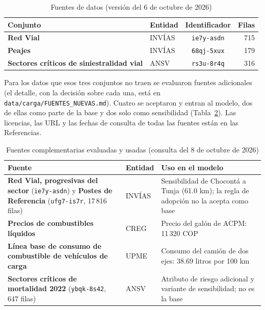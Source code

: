 \documentclass[12pt,a4paper]{article}
\begin{document}
\begin{table}[H]
\centering
\caption{Fuentes de datos (versión del 6 de octubre de 2026)}
\label{tab:fuentes}
\renewcommand{\arraystretch}{1.2}
\begin{tabular}{|l|l|c|r|}
\hline
\rowcolor{gray!20} \textbf{Conjunto} & \textbf{Entidad} & \textbf{Identificador} & \textbf{Filas} \\
\hline
\textbf{Red Vial} & INVÍAS & \texttt{ie7y-asdn} & 715 \\
\hline
\textbf{Peajes} & INVÍAS & \texttt{68qj-5xux} & 179 \\
\hline
\textbf{Sectores críticos de siniestralidad vial} & ANSV & \texttt{rs3u-8r4q} & 316 \\
\hline
\end{tabular}
\end{table}

Para los datos que esos tres conjuntos no traen se evaluaron fuentes
adicionales (el detalle, con la decisión sobre cada una, está en
\nolinkurl{data/carga/FUENTES\_NUEVAS.md}). Cuatro se aceptaron y entran al
modelo, dos de ellas como parte de la base y dos solo como sensibilidad
(Tabla~\ref{tab:fuentes-comp}). Las licencias, las URL y las fechas de consulta
de todas las fuentes están en las Referencias.

\begin{table}[H]
\centering
\caption{Fuentes complementarias evaluadas y usadas (consulta del 8 de octubre de 2026)}
\label{tab:fuentes-comp}
\renewcommand{\arraystretch}{1.2}
\begin{tabular}{|>{\raggedright\arraybackslash}p{4.6cm}|>{\raggedright\arraybackslash}p{3.2cm}|>{\raggedright\arraybackslash}p{5.6cm}|}
\hline
\rowcolor{gray!20} \textbf{Fuente} & \textbf{Entidad} & \textbf{Uso en el modelo} \\
\hline
\textbf{Red Vial, progresivas del sector} (\texttt{ie7y-asdn}) y \textbf{Postes de Referencia} (\texttt{ufg7-is7r}, 17\,816 filas) & INVÍAS & Sensibilidad de Chocontá a Tunja (61.0 km); la regla de adopción no la acepta como base \\
\hline
\textbf{Precios de combustibles líquidos} & CREG & Precio del galón de ACPM: 11\,320 COP \\
\hline
\textbf{Línea base de consumo de combustible de vehículos de carga} & UPME & Consumo del camión de dos ejes: 38.69 litros por 100 km \\
\hline
\textbf{Sectores críticos de mortalidad 2022} (\texttt{ybqk-8s42}, 647 filas) & ANSV & Atributo de riesgo adicional y variante de sensibilidad; no es la base \\
\hline
\end{tabular}
\end{table}
\end{document}
